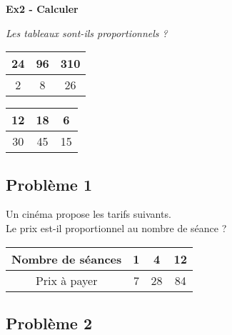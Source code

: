 \Pointilles[8]

\textbf{Ex2 - Calculer}

\textit{Les tableaux sont-ils proportionnels ? } 

\begin{multicols}{2}\noindent
  \begin{center}\begin{tabular}{|c|c|c|} \hline
    24 & 96 & 310 \\  \hline
    2 & 8 & 26\\  \hline
  \end{tabular}\end{center}

  \Pointilles[5]  \columnbreak 

  \begin{center}\begin{tabular}{|c|c|c|} \hline
    12 & 18 & 6 \\  \hline
    30 & 45 & 15\\  \hline
  \end{tabular}\end{center}

  \Pointilles[5] 

\end{multicols}

\newpage

\subsection*{Problème 1}

\begin{multicols}{2}\noindent

Un cinéma propose les tarifs suivants. \\
Le prix est-il proportionnel au nombre de séance ?


\begin{center}\begin{tabular}{|c|c|c|c|} \hline
  Nombre de séances & 1 &  4 & 12 \\  \hline
  Prix à payer      & 7 & 28 & 84\\  \hline
\end{tabular}\end{center}  \columnbreak 

\Pointilles[5] 

\end{multicols}

\subsection*{Problème 2}

